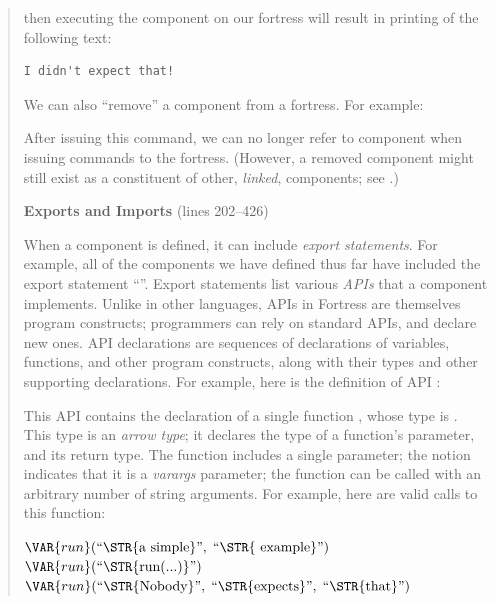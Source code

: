 \begin{description}
\begin{quote}
then executing the component  on our fortress will result in
printing of the following text:

\begin{verbatim}
I didn't expect that!
\end{verbatim}

We can also ``remove'' a component from a fortress.
For example:


After issuing this command, we can no longer refer to 
component when issuing commands to the fortress.
(However, a removed component might still exist as a constituent of other,
\emph{linked}, components; see .)

\textbf{Exports and Imports} (lines 202--426)

When a component is defined, it can include \emph{export statements}.
For example,
all of the components we have defined thus far
have included the export statement ``''.
Export statements list various \emph{APIs}
that a component implements.
Unlike in other languages, APIs in
Fortress are themselves program constructs; programmers can rely on
standard APIs, and declare new ones. API declarations are sequences of
declarations of
variables, functions, and other program constructs, along with their
types and other
supporting declarations. For example, here is the definition of API
:


This API contains the declaration of a single function ,
whose type is . This type is an
\emph{arrow type}; it declares the type of a function's parameter,
and its return type. The function  includes a single
parameter; the notion  indicates that it is a
\emph{varargs} parameter; the function  can be called with an
arbitrary number of string arguments. For example, here are
valid calls to this function:

\begin{Fortress}
\(\VAR{run}(\hbox{\rm``\STR{a~simple}''},\;\hbox{\rm``\STR{~example}''})\)\\
\(\VAR{run}(\hbox{\rm``\STR{run(...)}''})\)\\
\(\VAR{run}(\hbox{\rm``\STR{Nobody}''},\;\hbox{\rm``\STR{expects}''},\;\hbox{\rm``\STR{that}''})\)
\end{Fortress}



\end{quote}
\end{description}
